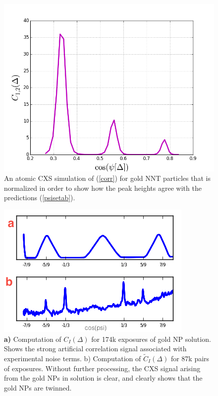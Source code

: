 \documentclass [11pt,fleqn]{article}
\begin{document}
\begin{figure}[h]
\begin{center}
\includegraphics[width=\textwidth,height=\textheight,keepaspectratio]{./cxs_peak.png}
\end{center}
\caption{An atomic CXS simulation of (\ref{corr}) for gold NNT particles that is normalized in order to show how the peak heights agree with the predictions (\ref{psisetab}).}
\label{fig:peak}
\end{figure}




\begin{figure}[h]
\begin{center}
\includegraphics[width=\textwidth,height=\textheight,keepaspectratio]{./raw_dif.png}
\end{center}
\caption{\textbf{a)} Computation of $C_I(\Delta)$ for 174k exposures of gold NP solution. Shows the strong artificial correlation signal associated with experimental noise terms. b) Computation of $\widetilde C_I(\Delta)$ for 87k pairs of exposures. Without further processing, the CXS signal arising from the gold NPs in solution is clear, and clearly shows that the gold NPs are twinned.}
\label{fig:raw_dif}
\end{figure}
\end{document}
